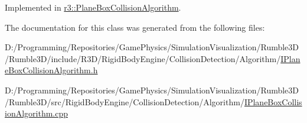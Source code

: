 Implemented in \mbox{\hyperlink{classr3_1_1_plane_box_collision_algorithm_a529c85973e9dab38e7427cdf9177d9ba}{r3\+::\+Plane\+Box\+Collision\+Algorithm}}.



The documentation for this class was generated from the following files\+:\begin{DoxyCompactItemize}
\item 
D\+:/\+Programming/\+Repositories/\+Game\+Physics/\+Simulation\+Visualization/\+Rumble3\+D/\+Rumble3\+D/include/\+R3\+D/\+Rigid\+Body\+Engine/\+Collision\+Detection/\+Algorithm/\mbox{\hyperlink{_i_plane_box_collision_algorithm_8h}{I\+Plane\+Box\+Collision\+Algorithm.\+h}}\item 
D\+:/\+Programming/\+Repositories/\+Game\+Physics/\+Simulation\+Visualization/\+Rumble3\+D/\+Rumble3\+D/src/\+Rigid\+Body\+Engine/\+Collision\+Detection/\+Algorithm/\mbox{\hyperlink{_i_plane_box_collision_algorithm_8cpp}{I\+Plane\+Box\+Collision\+Algorithm.\+cpp}}\end{DoxyCompactItemize}
